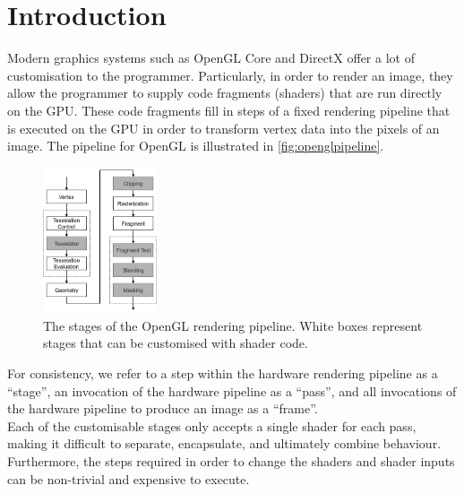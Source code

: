 \documentclass[format=sigconf]{acmart}
\begin{document}
\section{Introduction}\label{introduction}
Modern graphics systems such as OpenGL Core and DirectX offer a lot of customisation to the programmer. Particularly, in order to render an image, they allow the programmer to supply code fragments (shaders) that are run directly on the GPU. These code fragments fill in steps of a fixed rendering pipeline that is executed on the GPU in order to transform vertex data into the pixels of an image. The pipeline for OpenGL is illustrated in \autoref{fig:openglpipeline}. \\

\begin{figure}[h]
  \begin{center}
    \includegraphics[width=0.3\textwidth]{opengl-pipeline.png}
  \end{center}
  \caption{The stages of the OpenGL rendering pipeline. White boxes represent stages that can be customised with shader code.}
  \label{fig:openglpipeline}
\end{figure}

For consistency, we refer to a step within the hardware rendering pipeline as a ``stage'', an invocation of the hardware pipeline as a ``pass'', and all invocations of the hardware pipeline to produce an image as a ``frame''. \\

Each of the customisable stages only accepts a single shader for each pass, making it difficult to separate, encapsulate, and ultimately combine behaviour. Furthermore, the steps required in order to change the shaders and shader inputs can be non-trivial and expensive to execute. \\
\end{document}
